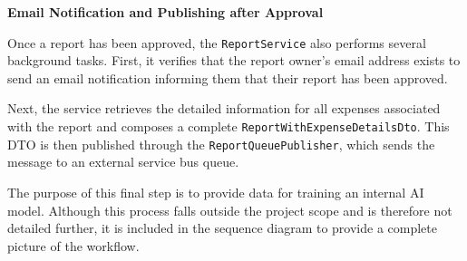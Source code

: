 \textbf{Email Notification and Publishing after Approval}

Once a report has been approved, the \texttt{ReportService} also performs several background tasks. First, it verifies that the report owner's email address exists to send an email notification informing them that their report has been approved.

\vspace{2cm}

Next, the service retrieves the detailed information for all expenses associated with the report and composes a complete \texttt{ReportWithExpenseDetailsDto}. This DTO is then published through the \texttt{ReportQueuePublisher}, which sends the message to an external service bus queue. 

The purpose of this final step is to provide data for training an internal AI model. Although this process falls outside the project scope and is therefore not detailed further, it is included in the sequence diagram to provide a complete picture of the workflow.
